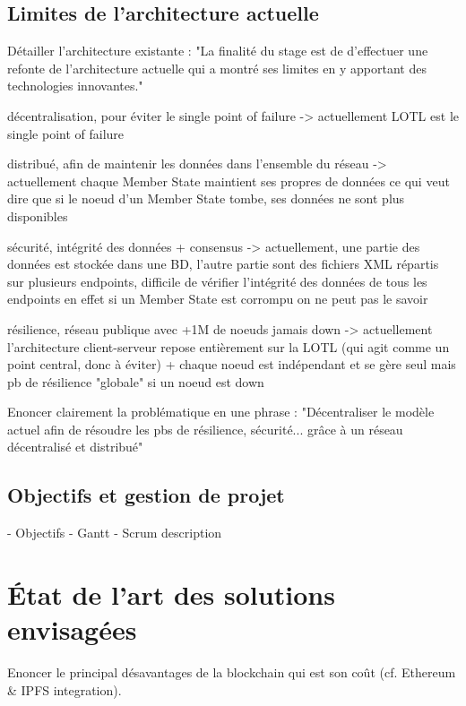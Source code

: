 \documentclass{tnreport}
\begin{document}
\section{Limites de l'architecture actuelle}

Détailler l'architecture existante :
"La finalité du stage est de d'effectuer une refonte de l'architecture actuelle qui a montré ses limites en y apportant des technologies innovantes."

décentralisation, pour éviter le single point of failure
-> actuellement LOTL est le single point of failure

distribué, afin de maintenir les données dans l'ensemble du réseau
-> actuellement chaque Member State maintient ses propres de données ce qui veut dire que si le noeud d'un Member State tombe, ses données ne sont plus disponibles

sécurité, intégrité des données + consensus
-> actuellement, une partie des données est stockée dans une BD, l'autre partie sont des fichiers XML répartis sur plusieurs endpoints, difficile de vérifier l'intégrité des données de tous les endpoints en effet si un Member State est corrompu on ne peut pas le savoir

résilience, réseau publique avec +1M de noeuds jamais down
-> actuellement l'architecture client-serveur repose entièrement sur la LOTL (qui agit comme un point central, donc à éviter) + chaque noeud est indépendant et se gère seul mais pb de résilience "globale" si un noeud est down


Enoncer clairement la problématique en une phrase :
"Décentraliser le modèle actuel afin de résoudre les pbs de résilience, sécurité... grâce à un réseau décentralisé et distribué"

\section{Objectifs et gestion de projet}

- Objectifs
- Gantt
- Scrum description

\chapter{État de l'art des solutions envisagées}

Enoncer le principal désavantages de la blockchain qui est son coût (cf. Ethereum \& IPFS integration).
\end{document}
